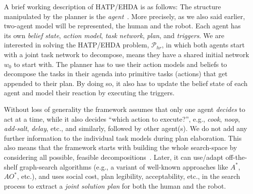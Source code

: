 \documentclass[letterpaper]{article} %
\begin{document}
A brief working description of HATP/EHDA is as follows: The structure manipulated by the planner is the \textit{agent}~\cite{thesisBuisan21,buisan:hal-03684211}. More precisely, as we also said earlier, two-agent model will be represented, the human and the robot. 
Each agent has its own \textit{belief state}, \textit{action model}, \textit{task network}, \textit{plan}, and \textit{triggers}. 
We are interested in solving the HATP/EHDA problem, $\mathcal{P}_{hr}$, in which both agents start with a joint task network to decompose, means they have a shared initial network $w_0$ to start with.
The planner has to use their action models and beliefs to decompose the tasks in their agenda into primitive tasks (actions) that get appended to their plan. By doing so, it also has to update the belief state of each agent and model their reaction by executing the triggers.


Without loss of generality the framework assumes that only one agent \textit{decides} to act at a time, while it also decides ``which action to execute?'', e.g., \textit{cook}, \textit{noop}, \textit{add-salt}, \textit{delay}, etc., and similarly, followed by other agent(s). 
We do not add any further information to the individual task models during plan elaboration. This also means that the framework starts with building the whole search-space by considering all possible, feasible decompositions~\cite{buisan:hal-03684211}. 
Later, it can use/adapt off-the-shelf graph-search algorithms (e.g., a variant of well-known approaches like $A^*$, $AO^*$, etc.), and uses social cost, plan legibility, acceptability, etc., in the search process to extract a \textit{joint solution plan} for both the human and the robot. 
\end{document}
